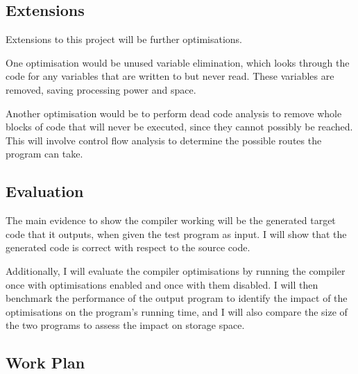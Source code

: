 \documentclass[12pt,a4paper]{article}
\begin{document}
\subsection*{Extensions}

Extensions to this project will be further optimisations.

One optimisation would be unused variable elimination, which looks through the code for any variables that are written to but never read. These variables are removed, saving processing power and space.

Another optimisation would be to perform dead code analysis to remove whole blocks of code that will never be executed, since they cannot possibly be reached. This will involve control flow analysis to determine the possible routes the program can take.


\subsection*{Evaluation}

The main evidence to show the compiler working will be the generated target code that it outputs, when given the test program as input. I will show that the generated code is correct with respect to the source code.

Additionally, I will evaluate the compiler optimisations by running the compiler once with optimisations enabled and once with them disabled. I will then benchmark the performance of the output program to identify the impact of the optimisations on the program's running time, and I will also compare the size of the two programs to assess the impact on storage space.

\subsection*{Work Plan}
\end{document}
